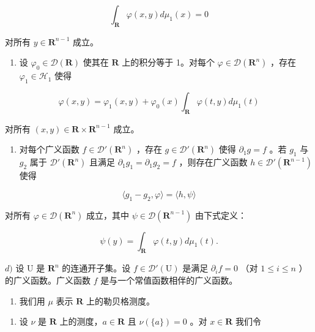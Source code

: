 \[
\int_ {\mathbf {R}} \varphi (x, y) d \mu_ {1} (x) = 0
\]

对所有 \(y \in \mathbf{R}^{n-1}\) 成立。

\begin{enumerate}
\def\labelenumi{\alph{enumi})}
\setcounter{enumi}{1}
\tightlist
\item
  设 \(\varphi_0\in \mathcal{D}(\mathbf{R})\) 使其在 \(\mathbf{R}\) 上的积分等于 1。对每个 \(\varphi \in \mathcal{D}(\mathbf{R}^n)\) ，存在 \(\varphi_{1}\in \mathcal{H}_{1}\) 使得
\end{enumerate}

\[
\varphi (x, y) = \varphi_ {1} (x, y) + \varphi_ {0} (x) \int_ {\mathbf {R}} \varphi (t, y) d \mu_ {1} (t)
\]

对所有 \((x,y)\in \mathbf{R}\times \mathbf{R}^{n - 1}\) 成立。

\begin{enumerate}
\def\labelenumi{\alph{enumi})}
\setcounter{enumi}{2}
\tightlist
\item
  对每个广义函数 \(f \in \mathcal{D}'(\mathbf{R}^{n})\) ，存在 \(g \in \mathcal{D}'(\mathbf{R}^{n})\) 使得 \(\partial_{1}g = f\) 。若 \(g_{1}\) 与 \(g_{2}\) 属于 \(\mathcal{D}'(\mathbf{R}^{n})\) 且满足 \(\partial_{1}g_{1} = \partial_{1}g_{2} = f\) ，则存在广义函数 \(h \in \mathcal{D}'(\mathbf{R}^{n-1})\) 使得
\end{enumerate}

\[
\langle g _ {1} - g _ {2}, \varphi \rangle = \langle h, \psi \rangle
\]

对所有 \(\varphi\in\mathcal{D}(\mathbf{R}^{n})\) 成立，其中 \(\psi\in\mathcal{D}(\mathbf{R}^{n-1})\) 由下式定义：

\[
\psi (y) = \int_ {\mathbf {R}} \varphi (t, y) d \mu_ {1} (t).
\]

\(d)\) 设 U 是 \(\mathbf{R}^{n}\) 的连通开子集。设 \(f \in \mathcal{D}'(\mathrm{U})\) 是满足 \(\partial_{i}f = 0\) （对 \(1 \leqslant i \leqslant n\) ）的广义函数。广义函数 \(f\) 是与一个常值函数相伴的广义函数。

\begin{enumerate}
\def\labelenumi{\arabic{enumi})}
\setcounter{enumi}{3}
\tightlist
\item
  我们用 \(\mu\) 表示 \(\mathbf{R}\) 上的勒贝格测度。
\end{enumerate}

\begin{enumerate}
\def\labelenumi{\alph{enumi})}
\tightlist
\item
  设 \(\nu\) 是 \(\mathbf{R}\) 上的测度，\(a \in \mathbf{R}\) 且 \(\nu(\{a\}) = 0\) 。对 \(x \in \mathbf{R}\) 我们令
\end{enumerate}

